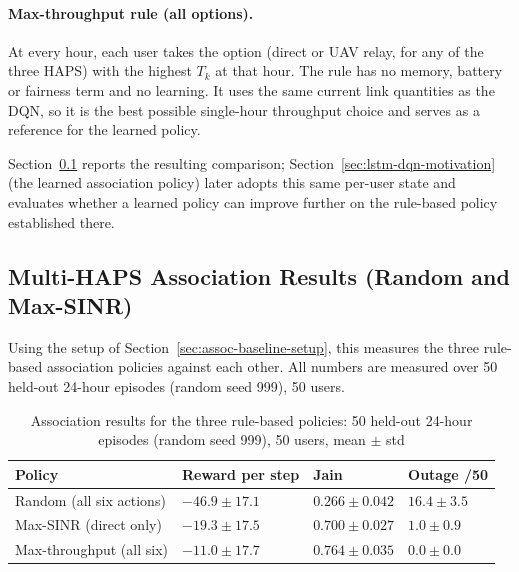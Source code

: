\documentclass[conference]{IEEEtran}
\begin{document}
\paragraph{Max-throughput rule (all options).} At every hour, each user takes the option (direct or UAV relay, for any of the three HAPS) with the highest $T_k$ at that hour. The rule has no memory, battery or fairness term and no learning. It uses the same current link quantities as the DQN, so it is the best possible single-hour throughput choice and serves as a reference for the learned policy.

Section~\ref{sec:assoc-baseline-results} reports the resulting
comparison; Section~\ref{sec:lstm-dqn-motivation} (the learned association policy) later adopts this same
per-user state and evaluates whether a learned policy can improve further on the
rule-based policy established there.

\subsection{Multi-HAPS Association Results (Random and Max-SINR)}
\label{sec:assoc-baseline-results}

Using the setup of Section~\ref{sec:assoc-baseline-setup}, this measures the three rule-based association policies against each other. All numbers are measured over 50 held-out 24-hour episodes (random seed 999), 50 users.

\begin{table}[t]
\centering
\caption{Association results for the three rule-based policies: 50 held-out 24-hour episodes (random seed 999), 50 users, mean $\pm$ std}
\label{tab:assoc-baseline-results}
{\scriptsize\setlength{\tabcolsep}{3pt}
\begin{tabularx}{\columnwidth}{|>{\raggedright\arraybackslash}X|>{\centering\arraybackslash}X|>{\centering\arraybackslash}X|>{\centering\arraybackslash}X|}
\hline
\textbf{Policy} & \textbf{Reward per step} & \textbf{Jain} & \textbf{Outage /50} \\
\hline
Random (all six actions) & $-46.9\pm17.1$ & $0.266\pm0.042$ & $16.4\pm3.5$ \\
\hline
Max-SINR (direct only) & $-19.3\pm17.5$ & $\mathbf{0.700\pm0.027}$ & $1.0\pm0.9$ \\
\hline
Max-throughput (all six) & $\mathbf{-11.0}\pm17.7$ & $0.764\pm0.035$ & $\mathbf{0.0}\pm0.0$ \\
\hline
\end{tabularx}}
\end{table}
\end{document}
